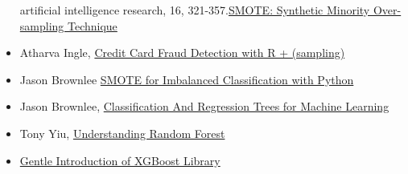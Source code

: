 \documentclass[
]{article}
\begin{document}
\begin{itemize}
  artificial intelligence research, 16,
  321-357.\href{https://arxiv.org/abs/1106.1813}{SMOTE: Synthetic
  Minority Over-sampling Technique}
\item
  Atharva Ingle,
  \href{https://www.kaggle.com/atharvaingle/credit-card-fraud-detection-with-r-sampling}{Credit
  Card Fraud Detection with R + (sampling)}
\item
  Jason Brownlee
  \href{https://machinelearningmastery.com/smote-oversampling-for-imbalanced-classification/}{SMOTE
  for Imbalanced Classification with Python}
\item
  Jason Brownlee,
  \href{https://machinelearningmastery.com/classification-and-regression-trees-for-machine-learning/}{Classification
  And Regression Trees for Machine Learning}
\item
  Tony Yiu,
  \href{https://towardsdatascience.com/understanding-random-forest-58381e0602d2}{Understanding
  Random Forest}
\item
  \href{https://sitiobigdata.com/2019/01/20/gentle-introduction-of-xgboost-library/\#}{Gentle
  Introduction of XGBoost Library}
\end{itemize}
\end{document}
